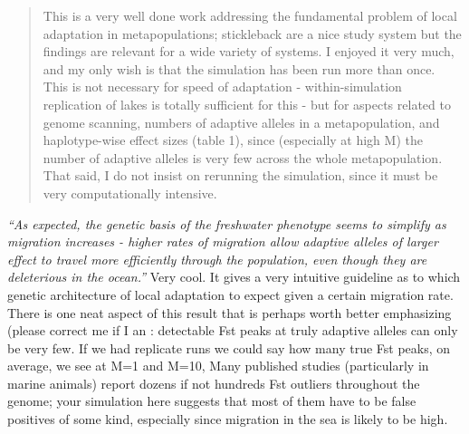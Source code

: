 



\begin{quote}
This is a very well done work addressing the fundamental problem of local
adaptation in metapopulations; stickleback are a nice study system but the
findings are relevant for a wide variety of systems. I enjoyed it very much,
and my only wish is that the simulation has been run more than once. This is
not necessary for speed of adaptation - within-simulation replication of lakes
is totally sufficient for this - but for aspects related to genome scanning,
numbers of adaptive alleles in a metapopulation, and haplotype-wise effect
sizes (table 1), since (especially at high M) the number of adaptive alleles is
very few across the whole metapopulation. That said, I do not insist on
rerunning the simulation, since it must be very computationally intensive.
\end{quote}


\begin{point}{\revref}
    \textit{``As expected, the genetic basis of the freshwater phenotype seems to simplify
    as migration increases - higher rates of migration allow adaptive alleles of
    larger effect to travel more efficiently through the population, even though
    they are deleterious in the ocean.''}
    Very cool. It gives a very intuitive guideline as to which genetic
    architecture of local adaptation to expect given a certain migration rate.
    There is one neat aspect of this result that is perhaps worth better
    emphasizing (please correct me if I an : detectable Fst peaks at truly adaptive
    alleles can only be very few. If we had replicate runs we could say how many
    true Fst peaks, on average, we see at M=1 and M=10, Many published studies
    (particularly in marine animals) report dozens if not hundreds Fst outliers
    throughout the genome; your simulation here suggests that most of them have to
    be false positives of some kind, especially since migration in the sea is
    likely to be high.
\end{point}



